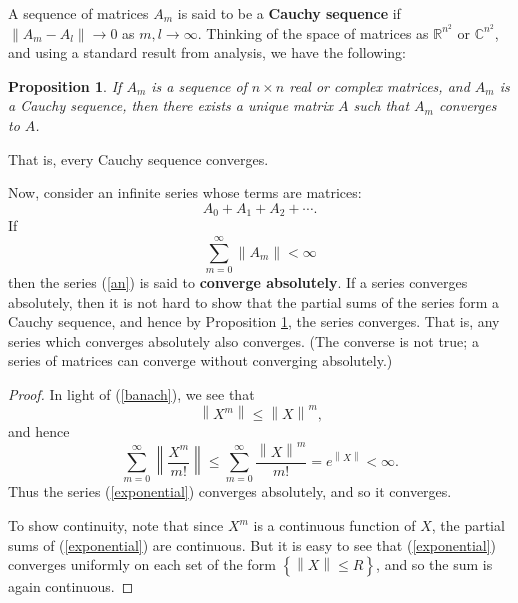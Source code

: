 \documentclass[12pt]{amsbook}
\theoremstyle{plain}
\newtheorem{proposition}[theorem]{Proposition}
\numberwithin{equation}{chapter}
\numberwithin{theorem}{chapter}
\begin{document}
A sequence of matrices $A_{m}$ is said to be a \textbf{Cauchy sequence} if
$\left\|  A_{m}-A_{l}\right\|  \rightarrow0$ as $m,l\rightarrow\infty$.
Thinking of the space of matrices as $\mathbb{R}^{n^{2}}$ or $\mathbb{C}%
^{n^{2}}$, and using a standard result from analysis, we have the following:

\begin{proposition}
\label{cauchy}If $A_{m}$ is a sequence of $n\times n$ real or complex
matrices, and $A_{m}$ is a Cauchy sequence, then there exists a unique matrix
$A$ such that $A_{m}$ converges to $A$.
\end{proposition}

\noindent That is, every Cauchy sequence converges.

Now, consider an infinite series whose terms are matrices:
\begin{equation}
A_{0}+A_{1}+A_{2}+\cdots\text{.}\label{an}%
\end{equation}
If
\[
\sum_{m=0}^{\infty}\left\|  A_{m}\right\|  <\infty
\]
then the series (\ref{an}) is said to \textbf{converge absolutely}. If a
series converges absolutely, then it is not hard to show that the partial sums
of the series form a Cauchy sequence, and hence by Proposition \ref{cauchy},
the series converges. That is, any series which converges absolutely also
converges. (The converse is not true; a series of matrices can converge
without converging absolutely.)

\begin{proof}
In light of (\ref{banach}), we see that
\[
\left\|  X^{m}\right\|  \leq\left\|  X\right\|  ^{m}\text{,}%
\]
and hence
\[
\sum_{m=0}^{\infty}\left\|  \frac{X^{m}}{m!}\right\|  \leq\sum_{m=0}^{\infty
}\frac{\left\|  X\right\|  ^{m}}{m!}=e^{\left\|  X\right\|  }<\infty\text{.}%
\]
Thus the series (\ref{exponential}) converges absolutely, and so it converges.

To show continuity, note that since $X^{m}$ is a continuous function of $X$,
the partial sums of (\ref{exponential}) are continuous. But it is easy to see
that (\ref{exponential}) converges uniformly on each set of the form $\left\{
\left\|  X\right\|  \leq R\right\}  $, and so the sum is again continuous.
\end{proof}
\end{document}
